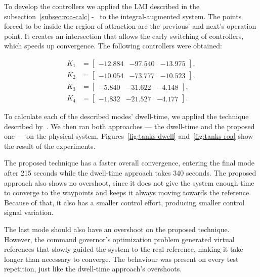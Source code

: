 To develop the controllers we applied the LMI described in the
subsection~\ref{subsec:roa-calc} -~ to the
integral-augmented system. The points forced to be inside the region of
attraction are the previous' and next's operation point. It creates an
intersection that allows the early switching of controllers, which speeds up
convergence. The following controllers were obtained:

\begin{align}
  K_{1} & = \begin{bmatrix} -12.884 & -97.540 & -13.975 \end{bmatrix}, \\
  K_{2} & = \begin{bmatrix} -10.054 & -73.777 & -10.523 \end{bmatrix}, \\
  K_{3} & = \begin{bmatrix} -5.840  & -31.622 & -4.148 \end{bmatrix}, \\
  K_{4} & = \begin{bmatrix} -1.832  & -21.527 & -4.177 \end{bmatrix}.
\end{align}

To calculate each of the described modes' dwell-time, we applied the technique
described by~\textcite{franzè.lucia.ea:command}. We then ran both approaches ---
the dwell-time and the proposed one --- on the physical system.
Figures~\ref{fig:tanks-dwell} and~\ref{fig:tanks-roa} show the result of the
experiments.

The proposed technique has a faster overall convergence, entering the final mode
after 215 seconds while the dwell-time approach takes 340 seconds. The proposed
approach also shows no overshoot, since it does not give the system enough time
to converge to the waypoints and keeps it always moving towards the reference.
Because of that, it also has a smaller control effort, producing smaller control
signal variation.

The last mode should also have an overshoot on the proposed technique. However,
the command governor's optimization problem generated virtual references that
slowly guided the system to the real reference, making it take longer than
necessary to converge. The behaviour was present on every test repetition, just
like the dwell-time approach's overshoots.

